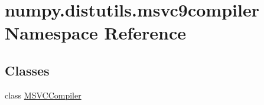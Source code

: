 \hypertarget{namespacenumpy_1_1distutils_1_1msvc9compiler}{}\section{numpy.\+distutils.\+msvc9compiler Namespace Reference}
\label{namespacenumpy_1_1distutils_1_1msvc9compiler}
\subsection*{Classes}
\begin{DoxyCompactItemize}
\item 
class \hyperlink{classnumpy_1_1distutils_1_1msvc9compiler_1_1MSVCCompiler}{M\+S\+V\+C\+Compiler}
\end{DoxyCompactItemize}
